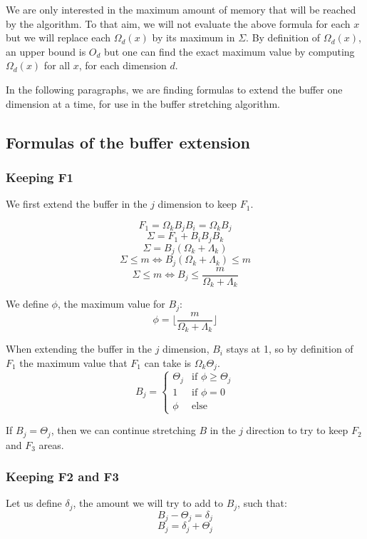 \documentclass[conference]{IEEEtran}
\begin{document}
We are only interested in the maximum amount of memory that will be reached by
the algorithm. To that aim, we will not evaluate the above formula for each $x$
but we will replace each $\Omega_d(x)$ by its maximum in $\Sigma$. By definition
of $\Omega_d(x)$, an upper bound is $O_d$ but one can find the exact maximum
value by computing $\Omega_d(x)$ for all $x$, for each dimension $d$.

In the following paragraphs, we are finding formulas to extend the buffer one
dimension at a time, for use in the buffer stretching algorithm.

\subsection{Formulas of the buffer extension}
\subsubsection{Keeping F1}

We first extend the buffer in the $j$ dimension to keep $F_1$.

\noindent $$F_1 = \Omega_k B_j B_i = \Omega_k B_j$$
$$\Sigma = F_1 + B_iB_jB_k$$
$$\Sigma = B_j (\Omega_k + \Lambda_k)$$
$$\Sigma \leq m \Leftrightarrow B_j (\Omega_k + \Lambda_k) \leq m$$
$$\Sigma \leq m \Leftrightarrow B_j \leq \frac{m}{\Omega_k + \Lambda_k}$$

We define $\phi$, the maximum value for $B_j$:
$$\phi = \lfloor \frac{m}{\Omega_k + \Lambda_k} \rfloor$$

When extending the buffer in the $j$ dimension, $B_i$ stays at 1, so by
definition of $F_1$ the maximum value that $F_1$ can take is $\Omega_k\Theta_j$.
$$B_j = \begin{cases}
  \Theta_j & \textrm{if }\phi \geq \Theta_j \\
  1 & \textrm{if }\phi = 0 \\
  \phi & \textrm{else}
\end{cases}$$

If $B_j=\Theta_j$, then we can continue stretching $B$ in the $j$ direction to
try to keep $F_2$ and $F_3$ areas.

\subsubsection{Keeping F2 and F3}

Let us define $\delta_j$, the amount we will try to add to $B_j$, such that:
$$B_j - \Theta_j = \delta_j$$
$$B_j = \delta_j + \Theta_j$$
\end{document}
